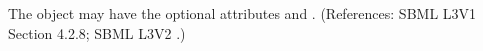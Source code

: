 The  object may have the optional attributes  and
. (References: SBML L3V1 Section 4.2.8; SBML L3V2 .)
